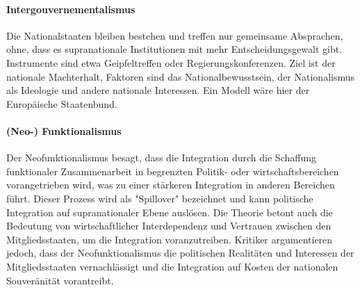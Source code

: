 \documentclass{article}
\begin{document}
	\paragraph{Intergouvernementalismus}
	Die Nationalstaaten bleiben bestehen und treffen nur gemeinsame Absprachen, ohne, dass es supranationale Institutionen mit mehr Entscheidungsgewalt gibt. Instrumente sind etwa Geipfeltreffen oder Regierungskonferenzen. Ziel ist der nationale Machterhalt, Faktoren sind das Nationalbewusstsein, der Nationalismus als Ideologie und andere nationale Interessen. Ein Modell wäre hier der Europäische Staatenbund. 

	\paragraph{(Neo-) Funktionalismus}
	Der Neofunktionalismus besagt, dass die Integration durch die Schaffung funktionaler Zusammenarbeit in begrenzten Politik- oder wirtschaftsbereichen vorangetrieben wird, was zu einer stärkeren Integration in anderen Bereichen führt. Dieser Prozess wird als "Spillover" bezeichnet und kann politische Integration auf supranationaler Ebene auslösen. Die Theorie betont auch die Bedeutung von wirtschaftlicher Interdependenz und Vertrauen zwischen den Mitgliedsstaaten, um die Integration voranzutreiben. Kritiker argumentieren jedoch, dass der Neofunktionalismus die politischen Realitäten und Interessen der Mitgliedsstaaten vernachlässigt und die Integration auf Kosten der nationalen Souveränität vorantreibt.
\end{document}
